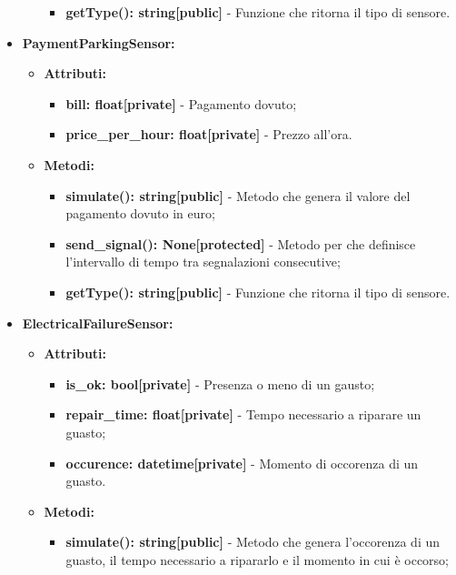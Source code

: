 \documentclass[8pt]{article}
\begin{document}
\begin{itemize}
\begin{itemize}
\begin{itemize}
            \item \textbf{getType(): string[public]} - Funzione che ritorna il tipo di sensore.
        \end{itemize}
    \end{itemize}
    \item \textbf{PaymentParkingSensor:}
    \begin{itemize}
	\setlength\itemsep{0em}
        \item \textbf{Attributi:}
        \begin{itemize}
	\setlength\itemsep{0em}
            \item \textbf{bill: float[private]} - Pagamento dovuto;
            \item \textbf{price\_per\_hour: float[private]} - Prezzo all'ora.
        \end{itemize}
        \item \textbf{Metodi:}
        \begin{itemize}
	\setlength\itemsep{0em}
            \item \textbf{simulate(): string[public]} - Metodo che genera il valore del pagamento dovuto in euro;
            \item \textbf{send\_signal(): None[protected]} - Metodo per che definisce l'intervallo di tempo tra segnalazioni consecutive;
            \item \textbf{getType(): string[public]} - Funzione che ritorna il tipo di sensore.
        \end{itemize}
    \end{itemize}
    \item \textbf{ElectricalFailureSensor:}
    \begin{itemize}
	\setlength\itemsep{0em}
        \item \textbf{Attributi:}
        \begin{itemize}
	\setlength\itemsep{0em}
            \item \textbf{is\_ok: bool[private]} - Presenza o meno di un gausto;
            \item \textbf{repair\_time: float[private]} - Tempo necessario a riparare un guasto;
            \item \textbf{occurence: datetime[private]} - Momento di occorenza di un guasto.
        \end{itemize}
        \item \textbf{Metodi:}
        \begin{itemize}
	\setlength\itemsep{0em}
            \item \textbf{simulate(): string[public]} - Metodo che genera l'occorenza di un guasto, il tempo necessario a ripararlo e il momento in cui è occorso;

\end{itemize}
\end{itemize}
\end{itemize}
\end{document}
